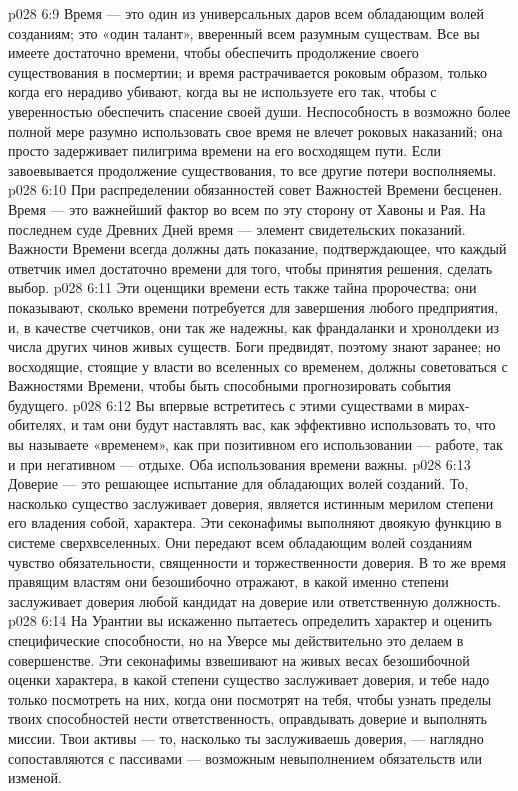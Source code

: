 \vs p028 6:9 \pc {}\bibnobreakspace {} Время --- это один из универсальных даров всем обладающим волей созданиям; это «один талант», вверенный всем разумным существам. Все вы имеете достаточно времени, чтобы обеспечить продолжение своего существования в посмертии; и время растрачивается роковым образом, только когда его нерадиво убивают, когда вы не используете его так, чтобы с уверенностью обеспечить спасение своей души. Неспособность в возможно более полной мере разумно использовать свое время не влечет роковых наказаний; она просто задерживает пилигрима времени на его восходящем пути. Если завоевывается продолжение существования, то все другие потери восполняемы.
\vs p028 6:10 При распределении обязанностей совет Важностей Времени бесценен. Время --- это важнейший фактор во всем по эту сторону от Хавоны и Рая. На последнем суде Древних Дней время --- элемент свидетельских показаний. Важности Времени всегда должны дать показание, подтверждающее, что каждый ответчик имел достаточно времени для того, чтобы принятия решения, сделать выбор.
\vs p028 6:11 Эти оценщики времени есть также тайна пророчества; они показывают, сколько времени потребуется для завершения любого предприятия, и, в качестве счетчиков, они так же надежны, как франдаланки и хронолдеки из числа других чинов живых существ. Боги предвидят, поэтому знают заранее; но восходящие, стоящие у власти во вселенных со временем, должны советоваться с Важностями Времени, чтобы быть способными прогнозировать события будущего.
\vs p028 6:12 Вы впервые встретитесь с этими существами в мирах\hyp{}обителях, и там они будут наставлять вас, как эффективно использовать то, что вы называете «временем», как при позитивном его использовании --- работе, так и при негативном --- отдыхе. Оба использования времени важны.
\vs p028 6:13 \pc {}\bibnobreakspace {} Доверие --- это решающее испытание для обладающих волей созданий. То, насколько существо заслуживает доверия, является истинным мерилом степени его владения собой, характера. Эти секонафимы выполняют двоякую функцию в системе сверхвселенных. Они передают всем обладающим волей созданиям чувство обязательности, священности и торжественности доверия. В то же время правящим властям они безошибочно отражают, в какой именно степени заслуживает доверия любой кандидат на доверие или ответственную должность.
\vs p028 6:14 На Урантии вы искаженно пытаетесь определить характер и оценить специфические способности, но на Уверсе мы действительно это делаем в совершенстве. Эти секонафимы взвешивают на живых весах безошибочной оценки характера, в какой степени существо заслуживает доверия, и тебе надо только посмотреть на них, когда они посмотрят на тебя, чтобы узнать пределы твоих способностей нести ответственность, оправдывать доверие и выполнять миссии. Твои активы --- то, насколько ты заслуживаешь доверия, --- наглядно сопоставляются с пассивами --- возможным невыполнением обязательств или изменой.
